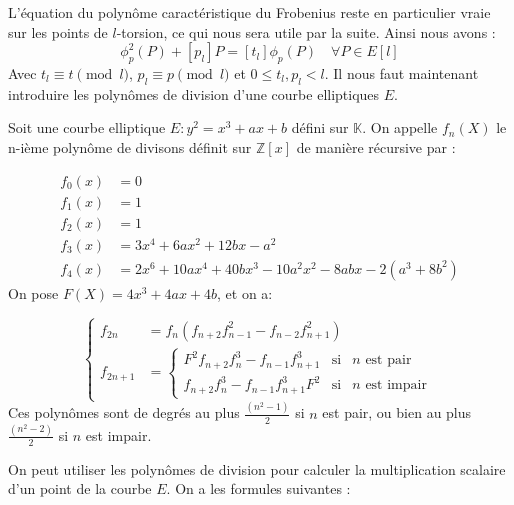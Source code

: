 \documentclass{article}
\begin{document}
L'équation du polynôme caractéristique du Frobenius reste en particulier vraie sur les points de $l$-torsion, ce qui nous sera utile par la suite. Ainsi nous avons : 
\begin{equation}
\label{eqnfrobenius}
 \phi_p^2(P)  + [p_l]P = [t_{l}] \phi_p(P) \quad \forall P \in E[l]
\end{equation} 
Avec $t_l \equiv t \pmod l$, $p_l \equiv p \pmod l$ et $0 \leq t_l, p_l < l$. 
\newline
Il nous faut maintenant introduire les polynômes de division d'une courbe elliptiques $E$.

\begin{defi}
Soit une courbe elliptique $E : y^2 = x^3 + ax+b$ défini sur $\mathbb{K}$. On appelle $f_n(X)$ le n-ième polynôme de divisons définit sur $\mathbb{Z}[x]$ de manière récursive par : 


\begin{align*}
f_0(x) &= 0 \\
f_1(x) &= 1 \\
f_2(x) &= 1 \\
f_3(x) &= 3x^4 + 6ax^2 +12bx - a^2 \\
f_4(x) &= 2x^6 + 10ax^4 +40bx^3 - 10a^2x^2 - 8abx - 2(a^3 + 8b^2)
\end{align*}
On pose $F(X)= 4x^3 + 4ax + 4b$, et on a:

\begin{equation}
\left\lbrace
\begin{array}{ll}
f_{2n}& =  f_n(f_{n+2}f_{n-1}^2 - f_{n-2}f_{n+1}^2)   \\
f_{2n+1}& = \left\lbrace 
\begin{array}{ccc}
F^2f_{n+2}f_n^3 - f_{n-1}f_{n+1}^3 & \mbox{si} & n \text{ est pair}\\
f_{n+2}f_n^3 - f_{n-1}f_{n+1}^3F^2 & \mbox{si} & n \text{ est impair} \end{array}\right.

\end{array} \right.
\end{equation} 
Ces polynômes sont de degrés au plus $\frac{(n^2 -1)}{2}$ si $n$ est pair, ou bien  au plus $\frac{(n^2 -2)}{2}$ si $n$ est impair.
\end{defi}


On peut utiliser les polynômes de division pour calculer la multiplication scalaire d'un point de la courbe $E$.
On a les formules suivantes : 
\end{document}
